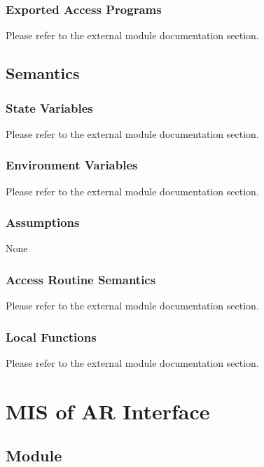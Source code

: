 \documentclass[12pt, titlepage]{article}
\begin{document}
\subsubsection{Exported Access Programs}

Please refer to the external module documentation section.

\subsection{Semantics}

\subsubsection{State Variables}

Please refer to the external module documentation section.

\subsubsection{Environment Variables}

Please refer to the external module documentation section.

\subsubsection{Assumptions}

None

\subsubsection{Access Routine Semantics}

Please refer to the external module documentation section.

\subsubsection{Local Functions}

Please refer to the external module documentation section.

\newpage

\section{MIS of AR Interface} \label{mARInterface}

\subsection{Module}
\end{document}
